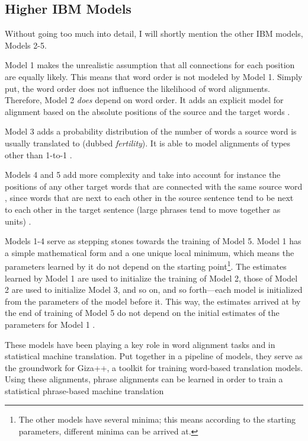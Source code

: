 \subsection{Higher IBM Models}
Without going too much into detail, I will shortly mention the other IBM models, Models 2-5. 

Model 1 makes the unrealistic assumption that all connections for each position are equally likely. 
This means that word order is not modeled by Model 1. 
Simply put, the word order does not influence the likelihood of word alignments.
Therefore, Model 2 \emph{does} depend on word order. 
It adds an explicit model for alignment based on the absolute positions of the source and the target words \autocites{brown-etal-1993-mathematics}[99]{koehn2009}.

Model 3 adds a probability distribution of the number of words a source word is usually translated to (dubbed \emph{fertility}). 
It is able to model alignments of types other than 1-to-1 \autocite[100]{koehn2009}. 

Models 4 and 5 add more complexity and take into account for instance the positions of any other target words that are connected with the same source word \autocite{brown-etal-1993-mathematics}, since words that are next to each other in the source sentence tend to be next to each other in the target sentence (large phrases tend to move together as units) \autocite[107]{koehn2009}.

Models 1-4 serve as stepping stones towards the training of Model 5. 
Model 1 has a simple mathematical form and a one unique local minimum, which means the parameters learned by it do not depend on the starting point\footnote{The other models have several minima; this means according to the starting parameters, different minima can be arrived at.}. 
The estimates learned by Model 1 are used to initialize the training of Model 2, those of Model 2 are used to initialize Model 3, and so on, and so forth---each model is initialized from the parameters of the model before it. 
This way, the estimates arrived at by the end of training of Model 5 do not depend  on the initial estimates of the parameters for Model 1 \autocite{brown-etal-1993-mathematics}. 

These models have been playing a key role in word alignment tasks and in statistical machine translation. 
Put together in a pipeline of models, they serve as the groundwork for Giza++, a toolkit for training word-based translation models. 
Using these alignments, phrase alignments can be learned in order to train a statistical phrase-based machine translation \autocites{och-ney-2000-improved,och-ney-2003-smt}

